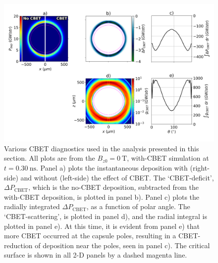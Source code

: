 \begin{figure}[t!]
    \includegraphics[width=\linewidth]{Results2/Images/magcbet_analysis.png}
    \centering
    \caption{Various \ac{CBET} diagnostics used in the analysis presented in this section.
    All plots are from the $B_{z0}=0\ \text{T}$, with-\ac{CBET} simulation at $t=0.30\ \text{ns}$.
    Panel a) plots the instantaneous deposition with (right-side) and without (left-side) the effect of \ac{CBET}.
    The `\ac{CBET}-deficit', $\Delta P_{\text{CBET}}$, which is the no-\ac{CBET} deposition, subtracted from the with-\ac{CBET} deposition, is plotted in panel b).
    Panel c) plots the radially integrated $\Delta P_{\text{CBET}}$, as a function of polar angle.
    The `\ac{CBET}-scattering', is plotted in panel d), and the radial integral is plotted in panel e).
    At this time, it is evident from panel e) that more \ac{CBET} occurred at the capsule poles, resulting in a \ac{CBET}-reduction of deposition near the poles, seen in panel c).
    The critical surface is shown in all 2-D panels by a dashed magenta line.}%
    \label{fig:Res2_magcbet_analysis}
\end{figure}

